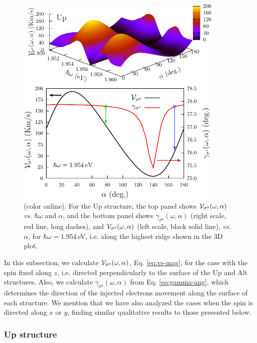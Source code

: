 \documentclass[floatfix,prb,aps,superscriptaddress,showpacs,11pt,preprint,letterpaper]{revtex4}
\def\tama{10cm}
\begin{document}
\begin{figure}[t]
\centering
\includegraphics[width=\tama]{figures/fig5}
\caption{(color online). For the Up structure, the top panel shows ${\cal
V}_{\sigma^\mathrm{z}} (\omega,\alpha)$ {\it vs.} $\hbar\omega$ and $\alpha$,
and the bottom panel shows $\gamma_{\sigma^\mathrm{z}} (\omega,\alpha)$ (right
scale, red line, long dashes), and ${\cal V}_{\sigma^\mathrm{z}}
(\omega,\alpha)$ (left scale, black solid line), {\it vs.} $\alpha$, for
$\hbar\omega=1.954$\,eV, i.e. along the highest ridge shown in the 3D plot. }
\label{fig:up-vsz-w2}
\end{figure}

In this subsection, we calculate ${\cal V}_{\sigma^\mathrm{z}}(\omega,\alpha)$,
Eq. \eqref{eq:vs-mag}, for the case with the spin fixed along $z$, i.e.
directed perpendicularly to the surface of the Up and Alt structures. Also, we
calculate $\gamma_{\sigma^\mathrm{z}}(\omega,\alpha)$ from Eq. 
\eqref{eq:gamma-ang}, which determines the direction  of the injected 
electrons movement along the surface of  each structure. We mention that we
have also  analyzed the cases when the spin  is directed along $x$ or
$y$, finding similar qualitative results to those presented below.

\subsubsection{Up structure}\label{up:fs}
\end{document}
